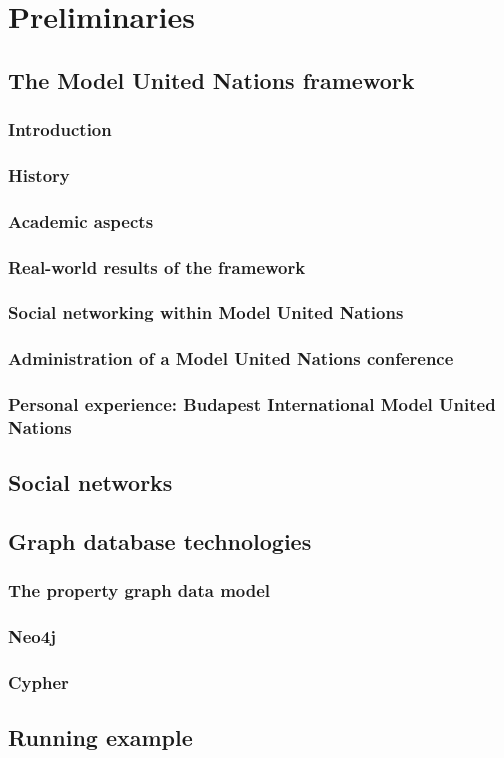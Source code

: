 \chapter{Preliminaries}
\label{chapter:preliminaries}

\section{The Model United Nations framework}
\subsection{Introduction}
\subsection{History}
\subsection{Academic aspects}
\subsection{Real-world results of the framework}
\subsection{Social networking within Model United Nations}
\subsection{Administration of a Model United Nations conference}
\subsection{Personal experience: Budapest International Model United Nations}

\section{Social networks}

\section{Graph database technologies}
\subsection{The property graph data model}
\subsection{Neo4j}
\subsection{Cypher}

\section{Running example}
